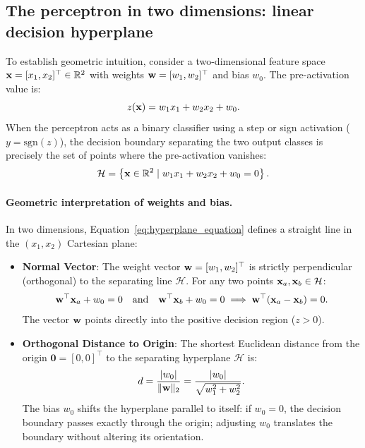 \documentclass[../../main.tex]{subfiles}
\begin{document}
\subsection{The perceptron in two dimensions: linear decision hyperplane}
To establish geometric intuition, consider a two-dimensional feature space $\mathbf{x} = [x_1, x_2]^\top \in \mathbb{R}^2$ with weights $\mathbf{w} = [w_1, w_2]^\top$ and bias $w_0$. The pre-activation value is:
\begin{equation}
\label{eq:2d_linear_boundary}
z(\mathbf{x}) = w_1 x_1 + w_2 x_2 + w_0.
\end{equation}
When the perceptron acts as a binary classifier using a step or sign activation ($y = \text{sgn}(z)$), the decision boundary separating the two output classes is precisely the set of points where the pre-activation vanishes:
\begin{equation}
\label{eq:hyperplane_equation}
\mathcal{H} = \left\{ \mathbf{x} \in \mathbb{R}^2 \mid w_1 x_1 + w_2 x_2 + w_0 = 0 \right\}.
\end{equation}

\paragraph{Geometric interpretation of weights and bias.}
In two dimensions, Equation~\eqref{eq:hyperplane_equation} defines a straight line in the $(x_1, x_2)$ Cartesian plane:
\begin{itemize}
    \item \textbf{Normal Vector}: The weight vector $\mathbf{w} = [w_1, w_2]^\top$ is strictly perpendicular (orthogonal) to the separating line $\mathcal{H}$. For any two points $\mathbf{x}_a, \mathbf{x}_b \in \mathcal{H}$:
    \[
    \mathbf{w}^\top \mathbf{x}_a + w_0 = 0 \quad \text{and} \quad \mathbf{w}^\top \mathbf{x}_b + w_0 = 0 \implies \mathbf{w}^\top (\mathbf{x}_a - \mathbf{x}_b) = 0.
    \]
    The vector $\mathbf{w}$ points directly into the positive decision region ($z > 0$).
    \item \textbf{Orthogonal Distance to Origin}: The shortest Euclidean distance from the origin $\mathbf{0} = [0, 0]^\top$ to the separating hyperplane $\mathcal{H}$ is:
    \begin{equation}
    \label{eq:hyperplane_distance}
    d = \frac{|w_0|}{\|\mathbf{w}\|_2} = \frac{|w_0|}{\sqrt{w_1^2 + w_2^2}}.
    \end{equation}
    The bias $w_0$ shifts the hyperplane parallel to itself: if $w_0 = 0$, the decision boundary passes exactly through the origin; adjusting $w_0$ translates the boundary without altering its orientation.
\end{itemize}
\end{document}
